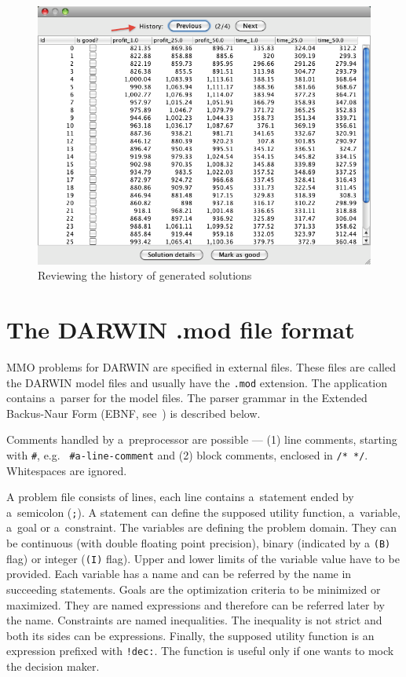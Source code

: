 \begin{figure}
  \centering
  \includegraphics[scale=0.7]{img/manual/10_history}
  \caption{Reviewing the history of generated solutions}
  \label{manual_10_history}
\end{figure}

\clearpage{}
\chapter{The DARWIN .mod file format}

MMO problems for DARWIN are specified in external files. These files are
called the DARWIN model files and usually have the \texttt{.mod}
extension. The application contains a~parser for the model files. The parser
grammar in the Extended Backus-Naur Form (EBNF, see~\cite{Wir77}) is described
below.



Comments handled by a~preprocessor are possible --- (1) line comments,
starting with \texttt{\#}, e.g. \texttt{ \#a-line-comment} and (2) block
comments, enclosed in \texttt{/* */}. Whitespaces are ignored.

A problem file consists of lines, each line contains a~statement ended by
a~semicolon (\texttt{;}). A statement can define the supposed utility
function, a~variable, a~goal or a~constraint. The variables are defining the
problem domain. They can be continuous (with double floating point precision),
binary (indicated by a \texttt{(B)} flag) or integer (\texttt{(I)} flag).
Upper and lower limits of the variable value have to be provided. Each
variable has a name and can be referred by the name in succeeding
statements. Goals are the optimization criteria to be minimized or
maximized. They are named expressions and therefore can be referred later by
the name. Constraints are named inequalities. The inequality is not strict and
both its sides can be expressions. Finally, the supposed utility function is
an expression prefixed with \texttt{!dec:}. The function is useful only if one
wants to mock the decision maker.

